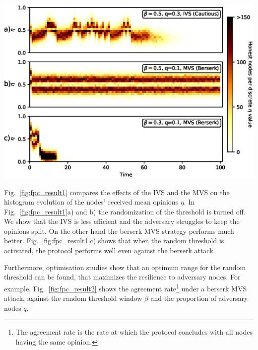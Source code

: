 \documentclass[../main.tex]{subfiles}
\begin{document}
\begin{center}
\begin{minipage}{\textwidth}
     \hspace{0.5cm}
     \includegraphics[scale=0.65]{images/epsHisto.eps}
     \label{fig:fpc_result1}
\end{minipage}\hfill
\end{center}

Fig.~\ref{fig:fpc_result1} compares the effects of the IVS and the MVS on the histogram evolution of the nodes’ received mean opinions $\eta$. In Fig.~\ref{fig:fpc_result1}a) and b) the randomization of the threshold is turned off. We show that the IVS is less efficient and the adversary struggles to keep the opinions split. On the other hand the berserk MVS strategy performs much better. Fig.~\ref{fig:fpc_result1}c) shows that when the random threshold is activated, the protocol performs well even against the berserk attack. 



Furthermore, optimisation studies show that an optimum range for the random threshold can be found, that maximizes the resilience to adversary nodes. For example, Fig.~\ref{fig:fpc_result2} shows the agreement rate\footnote{The agreement rate is the rate at which the protocol concludes with all nodes having the same opinion.} under a berserk MVS attack, against the random threshold window $\beta$ and the proportion of adversary nodes $q$. 
\end{document}
